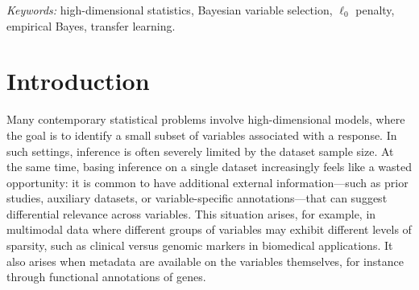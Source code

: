 \documentclass[
  12pt]{article}
\begin{document}
\bigskip
\begin{abstract}
We study variable selection (also called support recovery) in high-dimensional sparse linear regression when one has external information on which variables are likely to be associated with the response.
Consistent recovery is only possible under somewhat restrictive conditions on sample size, dimension, signal strength, and sparsity.
We investigate how these conditions can be relaxed by incorporating said external information. A key application that we consider is structural transfer learning, where variables selected in one or more source datasets are used to guide variable selection in a target dataset.
We introduce a family of likelihood penalties that depend on the external information, motivated by connections to Bayesian variable selection. We show that these methods achieve variable selection consistency in regimes where any method ignoring external information fails, and that they achieve consistency at faster rates. We first quantify the potential gains under ideal, oracle-chosen, penalties. We then propose computationally efficient empirical Bayes procedures that learn suitable penalties from the data. We prove that these procedures have improved variable selection properties compared to methods that do not use external information. We illustrate our approach using simulations and a genomics application, where results from mouse experiments are used to inform variable selection for gene expression data in humans.
\end{abstract}

\noindent%
{\it Keywords:} high-dimensional statistics, Bayesian variable selection, $\ell_0$ penalty, empirical Bayes, transfer learning.
\vfill

\newpage
{} %


\section{Introduction}

Many contemporary statistical problems involve high-dimensional models, where the goal is to identify a small subset of variables associated with a response.
In such settings, inference is often severely limited by the dataset sample size.
At the same time, basing inference on a single dataset increasingly feels like a wasted opportunity: it is common to have additional external information—such as prior studies, auxiliary datasets, or variable-specific annotations—that can suggest differential relevance across variables. This situation arises, for example, in multimodal data \citep{liang2023multimodal} where different groups of variables may exhibit different levels of sparsity, such as clinical versus genomic markers in biomedical applications.
It also arises when metadata are available on the variables themselves, for instance through functional annotations of genes.
\end{document}
